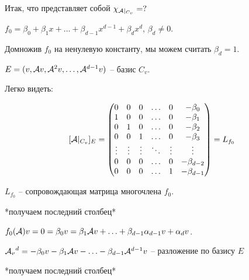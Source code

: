 \documentclass[main]{subfiles}
\begin{document}
Итак, что представляет собой $\chi_{\mathcal{A} |_{C_v}} = ?$

$f_0 = \beta_0 + \beta_1 x + \ldots + \beta_{d-1} x^{d-1} + \beta_{d} x^{d}$, $\beta_d \neq 0$.

Домножив $f_0$ на ненулевую константу, мы можем считать $\beta_d = 1$.

$E = (v, \mathcal{A} v, {\mathcal{A}}^2 v, \ldots, {\mathcal{A}}^{d-1} v)$ -- базис $C_v$.

Легко видеть:

\[[\mathcal{A} |_{C_v}]_E = \begin{pmatrix}
        0      & 0      & 0      & \ldots & 0      & -\beta_0     \\
        1      & 0      & 0      & \ldots & 0      & -\beta_1     \\
        0      & 1      & 0      & \ldots & 0      & -\beta_2     \\
        0      & 0      & 1      & \ldots & 0      & -\beta_3     \\
        \vdots & \vdots & \vdots & \ddots & \vdots & \vdots       \\
        0      & 0      & 0      & \ldots & 0      & -\beta_{d-2} \\
        0      & 0      & 0      & \ldots & 1      & -\beta_{d-1} \\
    \end{pmatrix} = L_{f_0}\]

\begin{center}
    $L_{f_0}$ -- сопровождающая матрица многочлена $f_0$.
\end{center}

\begin{center}
    *получаем последний столбец*

    $f_0(\mathcal{A}) v = 0 = \beta_0 v = \beta_1 \mathcal{A} v + \ldots + \beta_{d-1} \alpha_{d-1} v + \alpha_d v$.

    ${\mathcal{A}_v}^d = -\beta_0 v - \beta_1 \mathcal{A} v - \ldots - \beta_{d-1} {\mathcal{A}}^{d-1} v$ -- разложение по базису $E$

    *получаем последний столбец*
\end{center}
\end{document}
